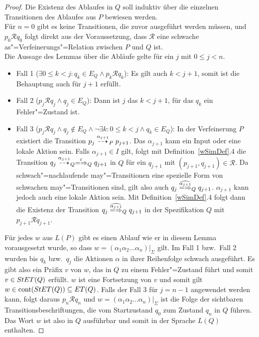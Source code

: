 \begin{proof}
  Die Existenz des Ablaufes in $Q$ soll induktiv über die einzelnen
  Transitionen des Ablaufes aus $P$ bewiesen werden.\\
  Für $n=0$ gibt es keine Transitionen, die zuvor ausgeführt werden müssen, und
  $p_0\mathcal{R} q_0$ folgt direkt aus der Voraussetzung, dass $\mathcal{R}$
  eine schwache as"=Verfeinerungs"=Relation zwischen $P$ und $Q$ ist.\\
  Die Aussage des Lemmas über die Abläufe gelte für ein $j$ mit $0\leq j<n$.
  \begin{itemize}
    \item Fall 1 ($\exists 0 \leq k < j: q_k\in E_Q \land p_k \mathcal{R}
      q_k$): Es gilt auch $k < j+1$, somit ist die Behauptung auch für $j+1$
      erfüllt.
    \item Fall 2 ($p_j\mathcal{R} q_j \land q_j\in E_Q$): Dann ist $j$ das $k <
      j+1$, für das $q_k$ ein Fehler"=Zustand ist.
    \item Fall 3 ($p_j \mathcal{R} q_j \land q_j\notin E_Q \land \neg\exists k:
      0 \leq k < j \land q_k\in E_Q$): In der Verfeinerung $P$ existiert die
      Transition $p_j \may[\alpha _{j+1}]_P p_{j+1}$. Das $\alpha _{j+1}$ kann
      ein Input oder eine lokale Aktion sein. Falls $\alpha _{j+1}\in I$ gilt,
      folgt mit Definition~\ref{wSimDef}.4 die Transition $q_j \may[\alpha
      _{j+1}]_Q \weakmay[\varepsilon]_Q q_{j+1}$ in $Q$ für ein $q_{j+1}$ mit
      $(p_{j+1},q_{j+1})\in\mathcal{R}$. Da schwach"=nachlaufende
      may"=Transitionen eine spezielle Form von schwachen may"=Transitionen
      sind, gilt also auch $q_j \weakmay[\widehat{\alpha _{j+1}}]_Q q_{j+1}$.
      $\alpha _{j+1}$ kann jedoch auch eine lokale Aktion sein. Mit
      Definition~\ref{wSimDef}.4 folgt dann die Existenz der Transition $q_j
      \weakmay[\widehat{\alpha _{j+1}}]_Q q_{j+1}$ in der Spezifikation $Q$ mit
      $p_{j+1} \mathcal{R} q_{j+1}$.
  \end{itemize}
  Für jedes $w$ aus $L(P)$ gibt es einen Ablauf wie er in diesem Lemma
  vorausgesetzt wurde, so dass $w=(\alpha _1\alpha _2\dots \alpha
  _n)|_{\Sigma}$ gilt. Im Fall 1 bzw.\ Fall 2 wurden bis $q_k$ bzw.\ $q_j$ die
  Aktionen $\alpha$ in ihrer Reihenfolge schwach ausgeführt. Es gibt also ein
  Präfix $v$ von $w$, das in $Q$ zu einem Fehler"=Zustand führt und somit
  $v\in StET (Q)$ erfüllt. $w$ ist eine Fortsetzung von $v$ und somit gilt
  $w\in\mathrm{cont} (StET (Q))\subseteq ET (Q)$. Falls der Fall 3 für $j = n-1$
  angewendet werden kann, folgt daraus $p_n\mathcal{R} q_n$ und $w = (\alpha
  _1\alpha _2\dots \alpha _n)|_{\Sigma}$ ist die Folge der sichtbaren
  Transitionsbeschriftungen, die vom Startzustand $q_0$ zum Zustand $q_n$ in
  $Q$ führen. Das Wort $w$ ist also in $Q$ ausführbar und somit in der Sprache
  $L(Q)$ enthalten.
\end{proof}

